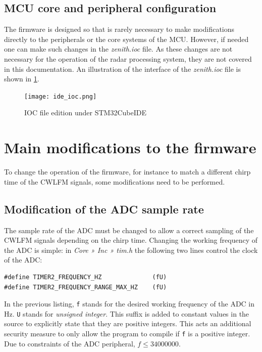 \subsection{MCU core and peripheral configuration}

The firmware is designed so that is rarely necessary to make modifications directly to the peripherals or the core systems of the MCU. However, if needed one can make such changes in the \textit{zenith.ioc} file. As these changes are not necessary for the operation of the radar processing system, they are not covered in this documentation. An illustration of the interface of the \textit{zenith.ioc} file is shown in \cref{fig:ide_ioc}.

\begin{figure}[ht]
	\centering
	\texttt{[image: ide\_ioc.png]}
	\caption{IOC file edition under STM32CubeIDE \label{fig:ide_ioc}}
\end{figure}

\section{Main modifications to the firmware}

To change the operation of the firmware, for instance to match a different chirp time of the CWLFM signals, some modifications need to be performed.

\subsection{Modification of the ADC sample rate}

The sample rate of the ADC must be changed to allow a correct sampling of the CWLFM signals depending on the chirp time. Changing the working frequency of the ADC is simple: in \textit{Core » Inc » tim.h} the following two lines control the clock of the ADC:

\begin{verbatim}
#define TIMER2_FREQUENCY_HZ              (fU)
#define TIMER2_FREQUENCY_RANGE_MAX_HZ    (fU)
\end{verbatim}

In the previous listing, \texttt{f} stands for the desired working frequency of the ADC in Hz.
\texttt{U} stands for \textit{unsigned integer}. This suffix is added to constant values in the source to explicitly state that they are positive integers. This acts an additional security measure to only allow the program to compile if \texttt{f} is a positive integer. Due to constraints of the ADC peripheral, $f \le 34000000$.

